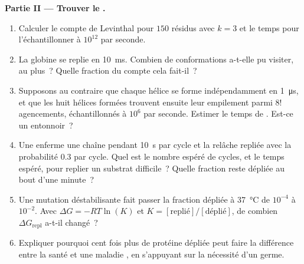 \begin{problem}
\medskip
\noindent\textbf{Partie II --- Trouver le .}
\begin{enumerate}[resume]
  \item Calculer le compte de Levinthal pour $150$ résidus avec
        $k = 3$ et le temps pour l'échantillonner à $10^{12}$ par
        seconde.
  \item La globine se replie en \qty{10}{ms}. Combien de conformations
        a-t-elle pu visiter, au plus~? Quelle fraction du compte cela
        fait-il~?
  \item Supposons au contraire que chaque hélice se forme
        indépendamment en \qty{1}{\micro s}, et que les huit hélices
        formées trouvent ensuite leur empilement parmi $8!$
        agencements, échantillonnés à $10^{6}$ par seconde. Estimer le
        temps de . Est-ce un entonnoir~?
  \item Une  enferme une chaîne pendant \qty{10}{s} par
        cycle et la relâche repliée avec la probabilité $0.3$ par
        cycle. Quel est le nombre espéré de cycles, et le temps espéré,
        pour replier un substrat difficile~? Quelle fraction reste
        dépliée au bout d'une minute~?
  \item Une mutation déstabilisante fait passer la fraction dépliée à
        \qty{37}{\celsius} de $10^{-4}$ à $10^{-2}$. Avec $\Delta G =
        -RT\ln(K)$ et $K = [\text{replié}]/[\text{déplié}]$, de combien
        $\Delta G_{\text{repl}}$ a-t-il changé~?
  \item Expliquer pourquoi cent fois plus de protéine dépliée peut
        faire la différence entre la santé et une maladie , en
        s'appuyant sur la nécessité d'un germe.
\end{enumerate}


\end{problem}
